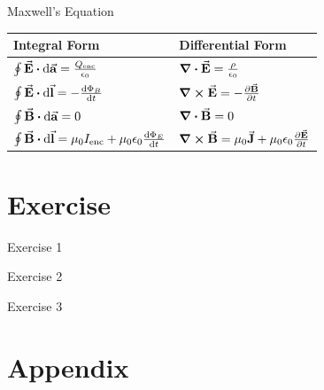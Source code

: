 \documentclass{beamer}
\begin{document}
\begin{frame}{Maxwell's Equation}
    \begin{table}[htbp]
        \centering
        \begin{tabular}{ll}
            \toprule
             Integral Form & Differential Form \\
            \midrule
            $\oint \va{E}\vdot\dd{\va{a}}=\frac{Q_{\text{enc}}}{\epsilon_0}$ & $\div{\va{E}} = \frac{\rho}{\epsilon_0}$ \\ \addlinespace
            $\oint \va{E}\vdot\dd{\va{l}}= -\dv{\Phi_B}{t}$ & $\curl{\va{E}}=-\pdv{\va{B}}{t}$ \\ \addlinespace
            $\oint \va{B}\vdot\dd{\va{a}}=0$ & $\div{\va{B}} = 0$ \\ \addlinespace
            $\oint \va{B}\vdot\dd{\va{l}}=\mu_0 I_{\text{enc}} + \mu_0 \epsilon_0 \dv{\Phi_E}{t}$ & $\curl{\va{B}}=\mu_0 \va{J}+ \mu_0 \epsilon_0 \pdv{\va{E}}{t}$             \\
            \bottomrule
        \end{tabular}
    \end{table}
\end{frame}


\section{Exercise}

\begin{frame}{Exercise 1}
  
\end{frame}

\begin{frame}{Exercise 2}
    
\end{frame}

\begin{frame}{Exercise 3}
    
\end{frame}

\section{Appendix}
\end{document}
